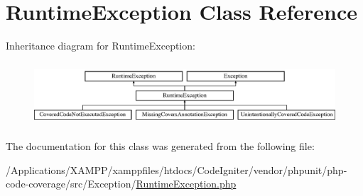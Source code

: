 \hypertarget{class_sebastian_bergmann_1_1_code_coverage_1_1_runtime_exception}{}\section{Runtime\+Exception Class Reference}
\label{class_sebastian_bergmann_1_1_code_coverage_1_1_runtime_exception}
Inheritance diagram for Runtime\+Exception\+:\begin{figure}[H]
\begin{center}
\leavevmode
\includegraphics[height=2.372881cm]{class_sebastian_bergmann_1_1_code_coverage_1_1_runtime_exception}
\end{center}
\end{figure}


The documentation for this class was generated from the following file\+:\begin{DoxyCompactItemize}
\item 
/\+Applications/\+X\+A\+M\+P\+P/xamppfiles/htdocs/\+Code\+Igniter/vendor/phpunit/php-\/code-\/coverage/src/\+Exception/\mbox{\hyperlink{phpunit_2php-code-coverage_2src_2_exception_2_runtime_exception_8php}{Runtime\+Exception.\+php}}\end{DoxyCompactItemize}
